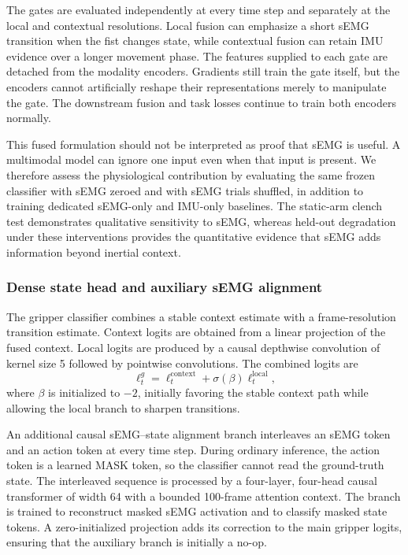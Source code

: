 The gates are evaluated independently at every time step and separately at the
local and contextual resolutions.  Local fusion can emphasize a short sEMG
transition when the fist changes state, while contextual fusion can retain IMU
evidence over a longer movement phase.  The features supplied to each gate are
detached from the modality encoders.  Gradients still train the gate itself,
but the encoders cannot artificially reshape their representations merely to
manipulate the gate.  The downstream fusion and task losses continue to train
both encoders normally.

This fused formulation should not be interpreted as proof that sEMG is useful.
A multimodal model can ignore one input even when that input is present.  We
therefore assess the physiological contribution by evaluating the same frozen
classifier with sEMG zeroed and with sEMG trials shuffled, in addition to
training dedicated sEMG-only and IMU-only baselines.  The static-arm clench test
demonstrates qualitative sensitivity to sEMG, whereas held-out degradation
under these interventions provides the quantitative evidence that sEMG adds
information beyond inertial context.

\subsubsection{Dense state head and auxiliary sEMG alignment}

The gripper classifier combines a stable context estimate with a
frame-resolution transition estimate.  Context logits are obtained from a
linear projection of the fused context.  Local logits are produced by a causal
depthwise convolution of kernel size 5 followed by pointwise convolutions.  The
combined logits are
\begin{equation}
    \boldsymbol{\ell}^{g}_t
    = \boldsymbol{\ell}^{\mathrm{context}}_t
    + \sigma(\beta)\boldsymbol{\ell}^{\mathrm{local}}_t,
\end{equation}
where $\beta$ is initialized to $-2$, initially favoring the stable context
path while allowing the local branch to sharpen transitions.

An additional causal sEMG--state alignment branch interleaves an sEMG token and
an action token at every time step.  During ordinary inference, the action
token is a learned MASK token, so the classifier cannot read the ground-truth
state.  The interleaved sequence is processed by a four-layer, four-head causal
transformer of width 64 with a bounded 100-frame attention context.  The branch
is trained to reconstruct masked sEMG activation and to classify masked state
tokens.  A zero-initialized projection adds its correction to the main gripper
logits, ensuring that the auxiliary branch is initially a no-op.


